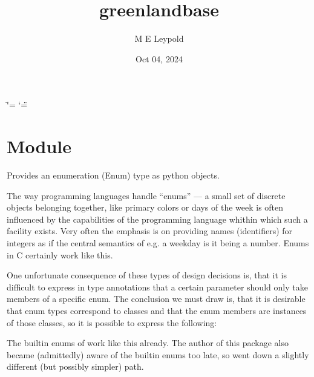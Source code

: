 \documentclass[letterpaper,10pt,english]{sphinxmanual}
\title{greenland\sphinxhyphen{}base}
\date{Oct 04, 2024}
\author{M E Leypold}
\begin{document}
\ifdefined\shorthandoff
  \ifnum\catcode`\=\string=\active\shorthandoff{=}\fi
  \ifnum\catcode`\"=\active{}\fi
\fi

\pagestyle{empty}
\sphinxmaketitle
\pagestyle{plain}
\sphinxtableofcontents
\pagestyle{normal}
\label{\detokenize{index::doc}}


\sphinxstepscope


\chapter{Module }
\label{\detokenize{enums:module-greenland-base-enums}}\label{\detokenize{enums::doc}}\label{\detokenize{enums:module-greenland.base.enums}}
\sphinxAtStartPar
Provides an enumeration (Enum) type as python objects.

\sphinxAtStartPar
The way programming languages handle “enums” — a small set of
discrete objects belonging together, like primary colors or days of
the week \textendash{} is often influenced by the capabilities of the programming
language whithin which such a facility exists. Very often the emphasis
is on providing names (identifiers) for integers as if the central
semantics of e.g. a weekday is it being a number. Enums in C certainly
work like this.

\sphinxAtStartPar
One unfortunate consequence of these types of design decisions is,
that it is difficult to express in type annotations that a certain
parameter should only take members of a specific enum. The conclusion
we must draw is, that it is desirable that enum types correspond to
classes and that the enum members are instances of those classes, so
it is possible to express the following:

\begin{sphinxVerbatim}[commandchars=\\\{\}]
  
\end{sphinxVerbatim}

\sphinxAtStartPar
The built\sphinxhyphen{}in enums of  work like this already.  The author of
this package also became (admittedly) aware of the built\sphinxhyphen{}in enums too
late, so went down a slightly different (but possibly simpler) path.
\end{document}
